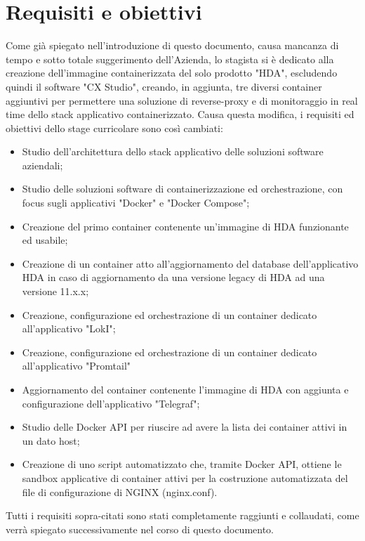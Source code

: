 \section{Requisiti e obiettivi}
Come già spiegato nell'introduzione di questo documento, causa mancanza di tempo e sotto totale suggerimento dell'Azienda, lo stagista si è dedicato alla creazione dell'immagine containerizzata del solo prodotto "HDA", escludendo quindi il software "CX Studio", creando, in aggiunta, tre diversi container aggiuntivi per permettere una soluzione di reverse-proxy e di monitoraggio in real time dello stack applicativo containerizzato.
Causa questa modifica, i requisiti ed obiettivi dello stage curricolare sono così cambiati:
\begin{itemize}
	\item Studio dell'architettura dello stack applicativo delle soluzioni software aziendali;
	\item Studio delle soluzioni software di containerizzazione ed orchestrazione, con focus sugli applicativi "Docker" e "Docker Compose";
	\item Creazione del primo container contenente un'immagine di HDA funzionante ed usabile;
	\item Creazione di un container atto all'aggiornamento del database dell'applicativo HDA in caso di aggiornamento da una versione legacy di HDA ad una versione 11.x.x;
	\item Creazione, configurazione ed orchestrazione di un container dedicato all'applicativo "LokI";
	\item Creazione, configurazione ed orchestrazione di un container dedicato all'applicativo "Promtail"
	\item Aggiornamento del container contenente l'immagine di HDA con aggiunta e configurazione dell'applicativo "Telegraf";
	\item Studio delle Docker API per riuscire ad avere la lista dei container attivi in un dato host;
	\item Creazione di uno script automatizzato che, tramite Docker API, ottiene le sandbox applicative di container attivi per la costruzione automatizzata del file di configurazione di NGINX (nginx.conf).
\end{itemize}

Tutti i requisiti sopra-citati sono stati completamente raggiunti e collaudati, come verrà spiegato successivamente nel corso di questo documento.

